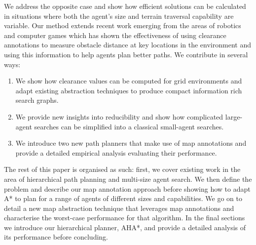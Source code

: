 We address the opposite case and show how efficient solutions can be calculated in situations where both the agent's size and terrain traversal capability are variable. Our method extends recent work emerging from the areas of robotics and computer games which has shown the effectiveness of using clearance annotations to measure obstacle distance at key locations in the environment and using this information to help agents plan better paths. We contribute in several ways:
\begin{enumerate}
\item{We show how clearance values can be computed for grid environments and adapt existing abstraction techniques to produce compact information rich search graphs.}
\item{We provide new insights into reducibility and show how complicated large-agent searches can be simplified into a classical small-agent searches.}
\item{We introduce two new path planners that make use of map annotations and provide a detailed empirical analysis evaluating their performance. }
\end{enumerate} 

The rest of this paper is organised as such: first, we cover existing work in the area of hierarchical path planning and multi-size agent search. We then define the problem and describe our map annotation approach before showing how to adapt A* to plan for a range of agents of different sizes and capabilities. We go on to detail a new map abstraction technique that leverages map annotations and characterise the worst-case performance for that algorithm. In the final sections we introduce our hierarchical planner, AHA*, and provide a detailed analysis of its performance before concluding.
